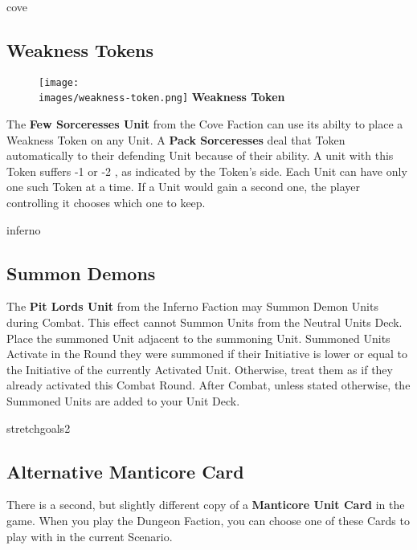 \begin{multicols*}{2}
\vspace*{1em}
\begin{expansion}{cove}
	\subsection*{Weakness Tokens}
  \setlength\intextsep{0pt}
  \setlength\columnsep{1em}
  \begin{wrapfigure}{r}{0.2\linewidth}
		\texttt{[image: \\images/weakness-token.png]}
        \centering\textbf{\scriptsize\color{darkcandyapplered}Weakness \mbox{Token}\\}
	\end{wrapfigure}
  The \textbf{Few Sorceresses Unit} from the Cove Faction can use its  abilty to place a Weakness Token on any Unit.
  A \textbf{Pack Sorceresses} deal that Token automatically to their defending Unit because of their  ability.
  A unit with this Token suffers -1  or -2 , as indicated by the Token's side.
  Each Unit can have only one such Token at a time.
  If a Unit would gain a second one, the player controlling it chooses which one to keep.
\end{expansion}

\begin{expansion}{inferno}
	\subsection*{Summon Demons}
	The \textbf{Pit Lords Unit} from the Inferno Faction may Summon Demon Units during Combat.
	This effect cannot Summon Units from the Neutral Units Deck.
	Place the summoned Unit adjacent to the summoning Unit.
	Summoned Units Activate in the Round they were summoned if their Initiative is lower or equal to the Initiative of the currently Activated Unit.
	Otherwise, treat them as if they already activated this Combat Round.
	After Combat, unless stated otherwise, the Summoned Units are added to your Unit Deck.
\end{expansion}

\vspace*{1em}
\begin{expansion}{stretchgoals2}
	\subsection*{Alternative Manticore Card}
    There is a second, but slightly different copy of a \textbf{Manticore Unit Card} in the game. When you play the Dungeon Faction, you can choose one of these Cards to play with in the current Scenario.
\end{expansion}


\end{multicols*}
